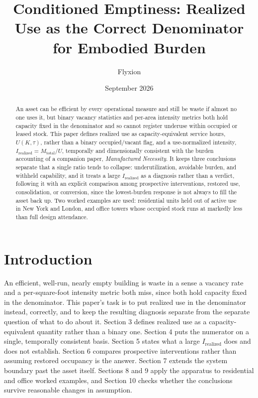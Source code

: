\documentclass[11pt]{article}
\title{Conditioned Emptiness: Realized Use as the Correct Denominator for Embodied Burden}
\author{Flyxion}
\affil{Independent Researcher}
\date{September 2026}
\begin{document}
\maketitle

\begin{abstract}
An asset can be efficient by every operational measure and still be waste if almost no one uses it, but binary vacancy statistics and per-area intensity metrics both hold capacity fixed in the denominator and so cannot register underuse within occupied or leased stock. This paper defines realized use as capacity-equivalent service hours, $U(K,\tau)$, rather than a binary occupied/vacant flag, and a use-normalized intensity, $I_{\text{realized}} = M_{\text{total}}/U$, temporally and dimensionally consistent with the burden accounting of a companion paper, \emph{Manufactured Necessity}. It keeps three conclusions separate that a single ratio tends to collapse: underutilization, avoidable burden, and withheld capability, and it treats a large $I_{\text{realized}}$ as a diagnosis rather than a verdict, following it with an explicit comparison among prospective interventions, restored use, consolidation, or conversion, since the lowest-burden response is not always to fill the asset back up. Two worked examples are used: residential units held out of active use in New York and London, and office towers whose occupied stock runs at markedly less than full design attendance.
\end{abstract}

\section{Introduction}

An efficient, well-run, nearly empty building is waste in a sense a vacancy rate and a per-square-foot intensity metric both miss, since both hold capacity fixed in the denominator. This paper's task is to put realized use in the denominator instead, correctly, and to keep the resulting diagnosis separate from the separate question of what to do about it. Section 3 defines realized use as a capacity-equivalent quantity rather than a binary one. Section 4 puts the numerator on a single, temporally consistent basis. Section 5 states what a large $I_{\text{realized}}$ does and does not establish. Section 6 compares prospective interventions rather than assuming restored occupancy is the answer. Section 7 extends the system boundary past the asset itself. Sections 8 and 9 apply the apparatus to residential and office worked examples, and Section 10 checks whether the conclusions survive reasonable changes in assumption.
\end{document}
